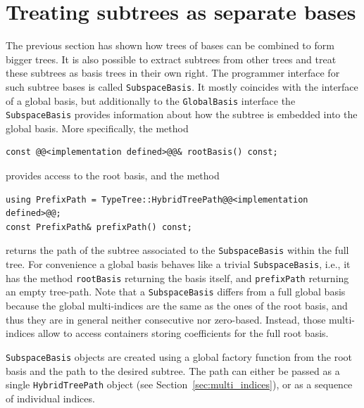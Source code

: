 \documentclass[a4paper,10pt,headings=normal,bibliography=totoc]{scrartcl}
\newcommand{\cpp}[1]{\lstinline[basicstyle=\ttfamily]!#1!}
\begin{document}
\section{Treating subtrees as separate bases}
\label{sec:subtrees}

The previous section has shown how trees of bases can be combined to form
bigger trees.  It is also possible to extract subtrees from other trees
and treat these subtrees as basis trees in their own right.
The programmer interface for such subtree bases is called \cpp{SubspaceBasis}.
It mostly coincides with the interface of a global basis, but additionally
to the \cpp{GlobalBasis} interface the \cpp{SubspaceBasis} provides
information about how the subtree is embedded into the global basis.
More specifically, the method
\begin{lstlisting}[style=Interface]
const @@<implementation defined>@@& rootBasis() const;
\end{lstlisting}
provides access to the root basis, and the method
\begin{lstlisting}[style=Interface]
using PrefixPath = TypeTree::HybridTreePath@@<implementation defined>@@;
const PrefixPath& prefixPath() const;
\end{lstlisting}
returns the
path of the subtree associated to the \cpp{SubspaceBasis}
within the full tree.
For convenience a global basis behaves like a trivial \cpp{SubspaceBasis},
i.e., it has the method \cpp{rootBasis} returning the basis itself,
and \cpp{prefixPath} returning an empty tree-path.
Note that a \cpp{SubspaceBasis} differs from a full
global basis because the global multi-indices are the
same as the ones of the root basis, and thus they are in general
neither consecutive nor zero-based. Instead, those multi-indices
allow to access containers storing coefficients for the
full root basis.

\cpp{SubspaceBasis} objects are created using a global
factory function from the root basis and the path
to the desired subtree. The path can either be passed
as a single \cpp{HybridTreePath} object (see Section~\ref{sec:multi_indices}), or
as a sequence of individual indices.
\end{document}

